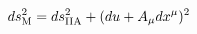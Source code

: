 \begin{equation}
\label{metMIIA}
ds_{\rm M}^2 = ds_{\rm IIA}^2 + (du + A_\mu dx^\mu)^2
\end{equation}

